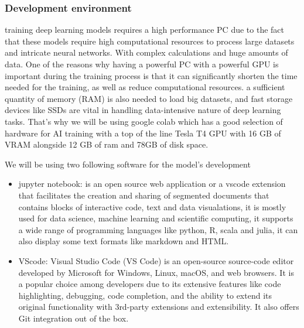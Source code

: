 \subsubsection{Development environment}
training deep learning models requires a high performance PC due to the fact that these models require high computational resources to process large datasets and intricate neural networks.  With complex calculations and huge amounts of data. One of the reasons why having a powerful PC with a powerful GPU is important during the training process is that it can significantly shorten the time needed for the training, as well as reduce computational resources. a sufficient quantity of memory (RAM) is also needed to load big datasets, and fast storage devices like SSDs are vital in handling data-intensive nature of deep learning tasks. That's why we will be using google colab which has a good selection of hardware for AI training with a top of the line Tesla T4 GPU with 16 GB of VRAM alongside 12 GB of ram and 78GB of disk space.


We will be using two following software for the model's development
\begin{itemize}
	\item jupyter notebook: is an open source web application or a vscode extension that facilitates the creation and sharing of segmented documents that contains blocks of interactive code, text and data visualations, it is mostly used for data science, machine learning and scientific computing, it supports a wide range of programming languages like python, R, scala and julia, it can also display some text formats like markdown and HTML.
	\item VScode: Visual Studio Code (VS Code) is an open-source source-code editor developed by Microsoft for Windows, Linux, macOS, and web browsers. It is a popular choice among developers due to its extensive features like code highlighting, debugging, code completion, and the ability to extend its original functionality with 3rd-party extensions and extensibility. It also offers Git integration out of the box.
\end{itemize}





